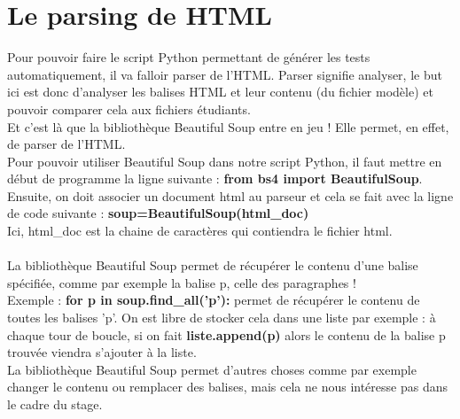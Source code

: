 \documentclass[12pt,twoside]{book}
\begin{document}
\section{Le parsing de HTML}
Pour pouvoir faire le script Python permettant de générer les tests automatiquement, il va falloir parser de l'HTML. Parser signifie analyser, le but ici est donc d'analyser les balises HTML et leur contenu (du fichier modèle) et pouvoir comparer cela aux fichiers étudiants.\\
Et c'est là que la bibliothèque Beautiful Soup entre en jeu ! Elle permet, en effet, de parser de l'HTML.\\
Pour pouvoir utiliser Beautiful Soup dans notre script Python, il faut mettre en début de programme la ligne suivante : \textbf{from bs4 import BeautifulSoup}.\\
Ensuite, on doit associer un document html au parseur et cela se fait avec la ligne de code suivante : \textbf{soup=BeautifulSoup(html\_doc)}\\
Ici, html\_doc est la chaine de caractères qui contiendra le fichier html.\\ \\
La bibliothèque Beautiful Soup permet de récupérer le contenu d'une balise spécifiée, comme par exemple la balise p, celle des paragraphes !\\ Exemple : \textbf{for p in soup.find\_all('p'):} permet de récupérer le contenu de toutes les balises 'p'. On est libre de stocker cela dans une liste par exemple : à chaque tour de boucle, si on fait \textbf{liste.append(p)} alors le contenu de la balise p trouvée viendra s'ajouter à la liste.\\
La bibliothèque Beautiful Soup permet d'autres choses comme par exemple changer le contenu ou remplacer des balises, mais cela ne nous intéresse pas dans le cadre du stage. 
\end{document}
